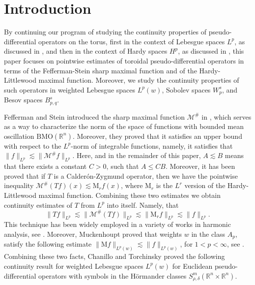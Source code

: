 \documentclass[12pt, reqno]{amsart}
\theoremstyle{definition}
\theoremstyle{remark}
\numberwithin{equation}{section}
\begin{document}
\maketitle
\tableofcontents
\allowdisplaybreaks

\section{Introduction}

By continuing our program of studying the continuity properties of pseudo-differential operators on the torus, first in the context of Lebesgue spaces $L^p$, as discussed in \cite{Cardona:Martinez}, and then in the context of Hardy spaces $H^p$, as discussed in \cite{Cardona:Martinez-2}, this paper focuses on pointwise estimates  of toroidal pseudo-differential operators in terms of the Fefferman-Stein sharp maximal function and of the Hardy-Littlewood maximal function. Moreover, we study the continuity properties of such operators in weighted Lebesgue spaces $L^p(w)$, Sobolev spaces $W^s_p$, and Besov spaces $B^s_{p,q}$.

Fefferman and Stein introduced the sharp maximal function $\mathcal{M}^\#$ in \cite{fefferman-stein}, which serves as a way to characterize the norm of the space of functions with bounded mean oscillation $\mathrm{BMO}(\mathbb{R}^n)$. Moreover, they proved that it satisfies an upper bound with respect to the $L^p$-norm of integrable functions, namely, it satisfies that $\|f\|_{L^p} \lesssim \|\mathcal{M}^\#f\|_{L^p}$. Here, and in the remainder of this paper, $A\lesssim B$ means that there exists a constant $C>0$, such that $A\leq CB$. Moreover, it has been proved that if $T$ is a Calder\'on-Zygmund operator, then we have the pointwise inequality $\mathcal{M}^\#(Tf)(x) \lesssim \mathrm{M}_rf(x)$, where $\mathrm{M}_r$ is the $L^r$ version of the Hardy-Littlewood maximal function. Combining these two estimates we obtain continuity estimates of $T$ from $L^p$ into itself. Namely, that
\begin{equation}
    \|Tf\|_{L^p} \lesssim\|\mathcal{M}^\#(Tf)\|_{L^p} \lesssim\| \mathrm{M}_rf\|_{L^p} \lesssim \|f\|_{L^p}.
    \label{eq:technique}
\end{equation}
This technique has been widely employed in a variety of works in harmonic analysis, see \cite{chanillo-torchinsky, fefferman-stein}. Moreover, Muckenhoupt proved that weights $w$ in the class $A_p$, satisfy the following estimate $\|\mathrm{M}f\|_{L^p(w)} \lesssim \| f\|_{L^p(w)}$, for $1<p<\infty$, see \cite{muckenhoupt}. Combining these two facts, Chanillo and Torchinsky \cite{chanillo-torchinsky} proved the following continuity result for weighted Lebesgue spaces $L^p(w)$ for Euclidean pseudo-differential operators with symbols in the H\"ormander classes $S^{m}_{\rho,\delta} (\mathbb{R}^n\times \mathbb{R}^n)$.
\end{document}
